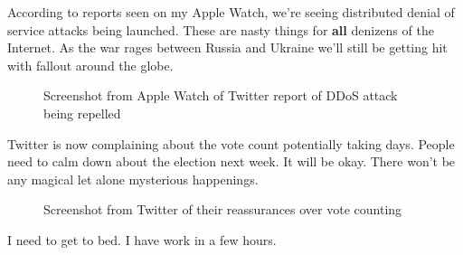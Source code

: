 According to reports seen on my Apple Watch, we're seeing distributed
denial of service attacks being launched. These are nasty things for
\textbf{all} denizens of the Internet. As the war rages between Russia
and Ukraine we'll still be getting hit with fallout around the globe.

\begin{figure}
\centering
{}
\caption{Screenshot from Apple Watch of Twitter report of DDoS attack
being repelled}
\end{figure}

Twitter is now complaining about the vote count potentially taking days.
People need to calm down about the election next week. It will be okay.
There won't be any magical let alone mysterious happenings.

\begin{figure}
\centering
{}
\caption{Screenshot from Twitter of their reassurances over vote
counting}
\end{figure}

I need to get to bed. I have work in a few hours.
